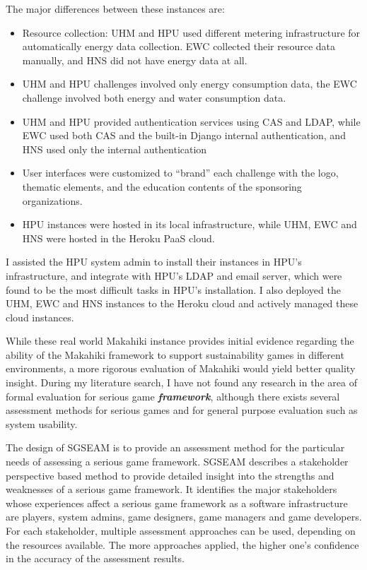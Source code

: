 The major differences between these instances are:
\begin{itemize}
\item Resource collection: UHM and HPU used different metering infrastructure for automatically energy data collection. EWC collected their resource data manually, and HNS did not have energy data at all. 
\item UHM and HPU challenges involved only energy consumption data, the EWC challenge involved both energy and water consumption data. 
\item UHM and HPU provided authentication services using CAS and LDAP, while EWC used both CAS and the built-in Django internal  authentication, and HNS used only the internal authentication
\item User interfaces were customized to ``brand'' each challenge with the logo, thematic elements, and the education contents of the sponsoring organizations.
\item HPU instances were hosted in its local infrastructure, while UHM, EWC and HNS were hosted in the Heroku PaaS cloud.
\end{itemize}

I assisted the HPU system admin to install their instances in HPU's infrastructure, and integrate with HPU's LDAP and email server, which were found to be the most difficult tasks in HPU's installation. I also deployed the UHM, EWC and HNS instances to the Heroku cloud and actively managed these cloud instances. 

While these real world Makahiki instance provides initial evidence regarding the ability of the Makahiki framework to support sustainability games in different environments, a more rigorous evaluation of Makahiki would yield better quality insight. During my literature search, I have not found any research in the area of formal evaluation for serious game {\em \bf framework}, although there exists several assessment methods for serious games and for general purpose evaluation such as system usability. 

The design of SGSEAM is to provide an assessment method for the particular needs of assessing a serious game framework. SGSEAM describes a stakeholder perspective based method to provide detailed insight into the strengths and weaknesses of a serious game framework. It identifies the major stakeholders whose experiences affect a serious game framework as a software infrastructure are players, system admins, game designers, game managers and game developers. For each stakeholder, multiple assessment approaches can be used, depending on the resources available. The more approaches applied, the higher one's confidence in the accuracy of the assessment results.

